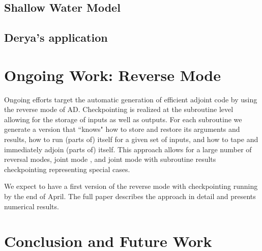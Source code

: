 \documentclass[acmtocl,acmnow]{acmtrans2m}
\begin{document}
\subsection{Shallow Water Model}
\subsection{Derya's application}

\section*{Ongoing Work: Reverse Mode}

Ongoing efforts target the automatic generation of efficient adjoint
code by using the reverse mode of AD. Checkpointing is realized at the 
subroutine level allowing for the storage of inputs as well as outputs. 
For each subroutine we generate a version that ``knows" how to store and 
restore its arguments and results, how to run (parts of) itself for a given
set of inputs, and how to tape and immediately adjoin (parts of) itself.
This approach allows for a large number of reversal modes, 
joint mode \cite{Gri00}, and joint mode with subroutine results checkpointing 
representing special cases. 

We expect to have a first version of the reverse mode with checkpointing
running by the end of April. The full paper describes the approach in detail 
and presents numerical results.

\section*{Conclusion and Future Work}
\end{document}
